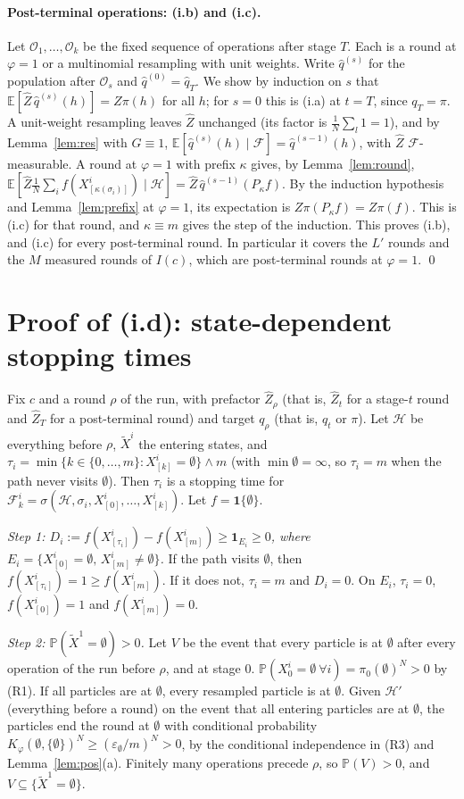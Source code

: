 \documentclass[11pt]{article}
\theoremstyle{remark}
\newcommand{\E}{\mathbb{E}}
\renewcommand{\P}{\mathbb{P}}
\newcommand{\cF}{\mathcal{F}}
\newcommand{\cH}{\mathcal{H}}
\newcommand{\Zh}{\widehat Z}
\newcommand{\qh}{\widehat q}
\newcommand{\ind}{\mathbf 1}
\begin{document}
\paragraph{Post-terminal operations: (i.b) and (i.c).} Let $\mathcal O_1,\dots,\mathcal O_k$ be the fixed sequence of operations after stage $T$. Each is a round at $\varphi=1$ or a multinomial resampling with unit weights. Write $\qh^{(s)}$ for the population after $\mathcal O_s$ and $\qh^{(0)}=\qh_T$. We show by induction on $s$ that $\E[\Zh\,\qh^{(s)}(h)]=Z\pi(h)$ for all $h$; for $s=0$ this is (i.a) at $t=T$, since $q_T=\pi$. A unit-weight resampling leaves $\Zh$ unchanged (its factor is $\frac1N\sum_l1=1$), and by Lemma~\ref{lem:res} with $G\equiv1$, $\E[\qh^{(s)}(h)\mid\cF]=\qh^{(s-1)}(h)$, with $\Zh$ $\cF$-measurable. A round at $\varphi=1$ with prefix $\kappa$ gives, by Lemma~\ref{lem:round}, $\E[\Zh\frac1N\sum_if(X^i_{[\kappa(\sigma_i)]})\mid\cH]=\Zh\,\qh^{(s-1)}(P_\kappa f)$. By the induction hypothesis and Lemma~\ref{lem:prefix} at $\varphi=1$, its expectation is $Z\pi(P_\kappa f)=Z\pi(f)$. This is (i.c) for that round, and $\kappa\equiv m$ gives the step of the induction. This proves (i.b), and (i.c) for every post-terminal round. In particular it covers the $L'$ rounds and the $M$ measured rounds of $I(c)$, which are post-terminal rounds at $\varphi=1$. \qed

\section{Proof of (i.d): state-dependent stopping times}

Fix $c$ and a round $\rho$ of the run, with prefactor $\Zh_\rho$ (that is, $\Zh_t$ for a stage-$t$ round and $\Zh_T$ for a post-terminal round) and target $q_\rho$ (that is, $q_t$ or $\pi$). Let $\cH$ be everything before $\rho$, $\tilde X^i$ the entering states, and $\tau_i=\min\{k\in\{0,\dots,m\}: X^i_{[k]}=\emptyset\}\wedge m$ (with $\min\emptyset=\infty$, so $\tau_i=m$ when the path never visits $\emptyset$). Then $\tau_i$ is a stopping time for $\cF^i_k=\sigma(\cH,\sigma_i,X^i_{[0]},\dots,X^i_{[k]})$. Let $f=\ind\{\emptyset\}$.

\emph{Step 1: $D_i:=f(X^i_{[\tau_i]})-f(X^i_{[m]})\ge \ind_{E_i}\ge 0$, where $E_i=\{X^i_{[0]}=\emptyset,\,X^i_{[m]}\ne\emptyset\}$.} If the path visits $\emptyset$, then $f(X^i_{[\tau_i]})=1\ge f(X^i_{[m]})$. If it does not, $\tau_i=m$ and $D_i=0$. On $E_i$, $\tau_i=0$, $f(X^i_{[0]})=1$ and $f(X^i_{[m]})=0$.

\emph{Step 2: $\P(\tilde X^1=\emptyset)>0$.} Let $V$ be the event that every particle is at $\emptyset$ after every operation of the run before $\rho$, and at stage 0. $\P(X_0^i=\emptyset\ \forall i)=\pi_0(\emptyset)^N>0$ by (R1). If all particles are at $\emptyset$, every resampled particle is at $\emptyset$. Given $\cH'$ (everything before a round) on the event that all entering particles are at $\emptyset$, the particles end the round at $\emptyset$ with conditional probability $K_\varphi(\emptyset,\{\emptyset\})^N\ge(\varepsilon_\emptyset/m)^N>0$, by the conditional independence in (R3) and Lemma~\ref{lem:pos}(a). Finitely many operations precede $\rho$, so $\P(V)>0$, and $V\subseteq\{\tilde X^1=\emptyset\}$.
\end{document}
